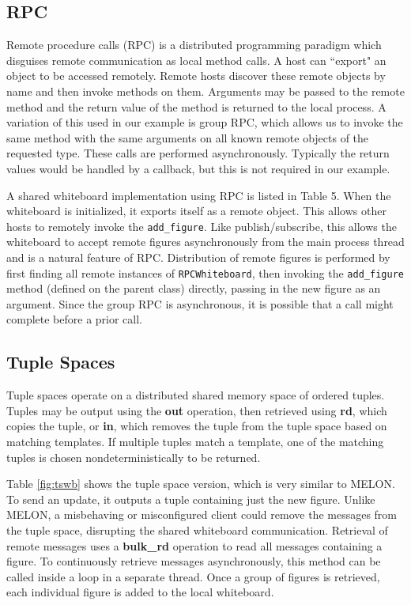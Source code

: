 \documentclass{llncs}
\begin{document}
\subsection{RPC}

Remote procedure calls (RPC) is a distributed programming paradigm which disguises remote communication as local method calls. A host can ``export" an object to be accessed remotely. Remote hosts discover these remote objects by name and then invoke methods on them. Arguments may be passed to the remote method and the return value of the method is returned to the local process. A variation of this used in our example is group RPC, which allows us to invoke the same method with the same arguments on all known remote objects of the requested type. These calls are performed asynchronously. Typically the return values would be handled by a callback, but this is not required in our example.

A shared whiteboard implementation using RPC is listed in Table 5. When the whiteboard is initialized, it exports itself as a remote object. This allows other hosts to remotely invoke the \texttt{add\_figure}. Like publish/subscribe, this allows the whiteboard to accept remote figures asynchronously from the main process thread and is a natural feature of RPC. Distribution of remote figures is performed by first finding all remote instances of \texttt{RPCWhiteboard}, then invoking the \texttt{add\_figure} method (defined on the parent class) directly, passing in the new figure as an argument. Since the group RPC is asynchronous, it is possible that a call might complete before a prior call.

\subsection{Tuple Spaces}

Tuple spaces operate on a distributed shared memory space of ordered tuples. Tuples may be output using the \textbf{out} operation, then retrieved using \textbf{rd}, which copies the tuple, or \textbf{in}, which removes the tuple from the tuple space based on matching templates. If multiple tuples match a template, one of the matching tuples is chosen nondeterministically to be returned.

Table \ref{fig:tswb} shows the tuple space version, which is very similar to MELON. To send an update, it outputs a tuple containing just the new figure. Unlike MELON, a misbehaving or misconfigured client could remove the messages from the tuple space, disrupting the shared whiteboard communication. Retrieval of remote messages uses a \textbf{bulk\_rd} operation to read all messages containing a figure. To continuously retrieve messages asynchronously, this method can be called inside a loop in a separate thread. Once a group of figures is retrieved, each individual figure is added to the local whiteboard. 
\end{document}
